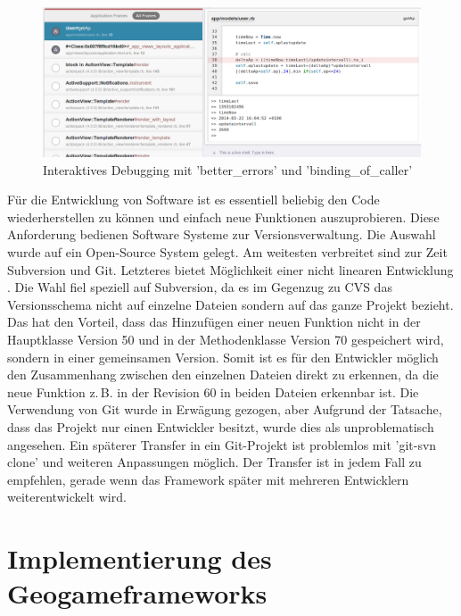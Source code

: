 \begin{figure}[H]
\begin{center}
\includegraphics[width=155mm]{images/ch5_img08_livebinding.png}
\caption{Interaktives Debugging mit 'better\_errors' und 'binding\_of\_caller'}
\label{img:ch5_img08_livebinding}
\end{center}
\end{figure}

Für die Entwicklung von Software ist es essentiell beliebig den Code wiederherstellen zu können und einfach neue Funktionen auszuprobieren. Diese Anforderung bedienen Software Systeme zur Versionsverwaltung. 
Die Auswahl wurde auf ein Open-Source System gelegt. Am weitesten verbreitet sind zur Zeit Subversion und Git. Letzteres bietet Möglichkeit einer nicht linearen Entwicklung \cite{Bird.2009}.
Die Wahl fiel speziell auf Subversion, da es im Gegenzug zu CVS das Versionsschema nicht auf einzelne Dateien sondern auf das ganze Projekt bezieht.
Das hat den Vorteil, dass das Hinzufügen einer neuen Funktion nicht in der Hauptklasse Version 50 und in der Methodenklasse Version 70 gespeichert wird, sondern in einer gemeinsamen Version.
Somit ist es für den Entwickler möglich den Zusammenhang zwischen den einzelnen Dateien direkt zu erkennen, da die neue Funktion z.\,B. in der Revision 60 in beiden Dateien erkennbar ist.
Die Verwendung von Git wurde in Erwägung gezogen, aber Aufgrund der Tatsache, dass das Projekt nur einen Entwickler besitzt, wurde dies als unproblematisch angesehen. Ein späterer Transfer in ein Git-Projekt ist problemlos mit 'git-svn clone' und weiteren Anpassungen möglich. Der Transfer ist in jedem Fall zu empfehlen, gerade wenn das Framework später mit mehreren Entwicklern weiterentwickelt wird.

\section{Implementierung des Geogameframeworks}
\label{ch5:s:Implementierung}

